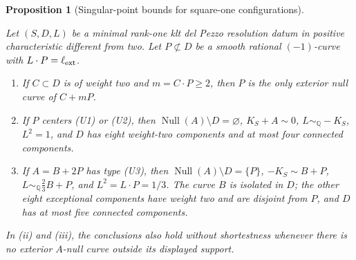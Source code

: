 \documentclass[11pt,reqno]{amsart}
\newtheorem{proposition}[proposition]{Proposition}
\theoremstyle{definition}
\theoremstyle{remark}
\DeclareMathOperator{\Null}{Null}
\newcommand{\QQ}{\mathbb Q}
\numberwithin{equation}{section}
\begin{document}
\begin{proposition}[Singular-point bounds for square-one configurations]
\label{prop:square-one-bound}

Let $(S,D,L)$ be a minimal rank-one klt del Pezzo resolution datum
in positive characteristic different from two. Let $P\not\subset D$ be a smooth rational
$(-1)$-curve with $L\cdot P=\ell_{\rm ext}$.
\begin{enumerate}[label=\textup{(\roman*)}]
\item If $C\subset D$ is of weight two and $m=C\cdot P\ge2$, then
      $P$ is the only exterior null curve of $C+mP$.
\item If $P$ centers \textup{(U1)} or \textup{(U2)}, then
      $\Null(A)\setminus D=\varnothing$, $K_S+A\sim0$,
      $L\sim_{\QQ}-K_S$, $L^2=1$, and $D$ has eight weight-two
      components and at most four connected components.
\item If $A=B+2P$ has type \textup{(U3)}, then
      $\Null(A)\setminus D=\{P\}$,
      $-K_S\sim B+P$, $L\sim_{\QQ}\tfrac23B+P$, and
      $L^2=L\cdot P=1/3$. The curve $B$ is isolated in $D$;
      the other eight exceptional components have weight two and are disjoint
      from $P$, and $D$ has at most five connected components.
\end{enumerate}
In \textup{(ii)} and \textup{(iii)}, the conclusions also hold without
shortestness whenever there is no exterior $A$-null curve outside its
displayed support. 
\end{proposition}
\end{document}
